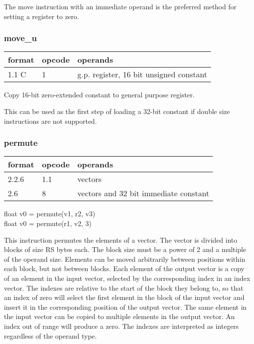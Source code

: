 \documentclass[forwardcom.tex]{subfiles}
\begin{document}
The move instruction with an immediate operand is the preferred method for setting a register to zero.


\subsubsection{move\_u}
\label{table:moveUInstruction}
\begin{tabular}{|p{12mm}|p{12mm}|p{110mm}|}
\hline
\bfseries format & \bfseries opcode & \bfseries operands \\ \hline
1.1 C & 1 & g.p. register, 16 bit unsigned constant \\ \hline
\end{tabular}
\vspace{2mm}

Copy 16-bit zero-extended constant to general
purpose register.

This can be used as the first step of loading a 32-bit constant if double size instructions are not supported.

\subsubsection{permute}
\label{table:permuteInstruction}
\begin{tabular}{|p{12mm}|p{12mm}|p{110mm}|}
\hline
\bfseries format & \bfseries opcode & \bfseries operands \\ \hline
2.2.6 & 1.1 & vectors \\ \hline
2.6   & 8   & vectors and 32 bit immediate constant \\ \hline
\end{tabular}
\vspace{2mm}

float v0 = permute(v1, r2, v3) \\
float v0 = permute(r1, v2, 3) \\
\vspace{2mm}

This instruction permutes the elements of a vector. The vector is divided into blocks of size RS bytes each. The block size must be a power of 2 and a multiple of the operand size. Elements can be moved arbitrarily between positions within each block, but not between blocks. Each element of the output vector is a copy of an element in the input vector, selected by the corresponding index in an index vector. The indexes are relative to the start of the block they belong to, so that an index of zero will select the first element in the block of the input vector and insert it in the corresponding position of the output vector. The same element in the input vector can be copied to multiple elements in the output vector. An index out of range will produce a zero. The indexes are interpreted as  integers regardless of the operand type.
\vspace{2mm}
\end{document}
